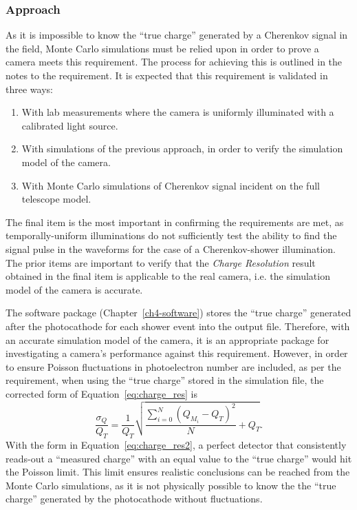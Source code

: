 \subsubsection{Approach}
As it is impossible to know the ``true charge'' generated by a Cherenkov signal in the field, Monte Carlo simulations must be relied upon in order to prove a camera meets this requirement. The process for achieving this is outlined in the notes to the requirement. It is expected that this requirement is validated in three ways:
\begin{enumerate}
\item With lab measurements where the camera is uniformly illuminated with a calibrated light source.
\item With simulations of the previous approach, in order to verify the simulation model of the camera.
\item With Monte Carlo simulations of Cherenkov signal incident on the full telescope model.
\end{enumerate}
The final item is the most important in confirming the requirements are met, as temporally-uniform illuminations do not sufficiently test the ability to find the signal pulse in the waveforms for the case of a Cherenkov-shower illumination. The prior items are important to verify that the \textit{Charge Resolution} result obtained in the final item is applicable to the real camera, i.e. the simulation model of the camera is accurate.

The software package  (Chapter~\ref{ch4-software}) stores the ``true charge'' generated after the photocathode for each shower event into the output file. Therefore, with an accurate simulation model of the camera, it is an appropriate package for investigating a camera's performance against this requirement. However, in order to ensure Poisson fluctuations in photoelectron number are included, as per the requirement, when using the ``true charge'' stored in the simulation file, the corrected form of Equation~\ref{eq:charge_res} is
\begin{equation} \label{eq:charge_res2}
\frac{\sigma_Q}{Q_T} = \frac{1}{Q_T} \sqrt{\frac{\sum_{i=0}^N (Q_{M_i} - Q_T)^2}{N} + Q_T}.
\end{equation}
With the form in Equation~\ref{eq:charge_res2}, a perfect detector that consistently reads-out a ``measured charge'' with an equal value to the ``true charge'' would hit the Poisson limit. This limit ensures realistic conclusions can be reached from the Monte Carlo simulations, as it is not physically possible to know the the ``true charge'' generated by the photocathode without fluctuations.

